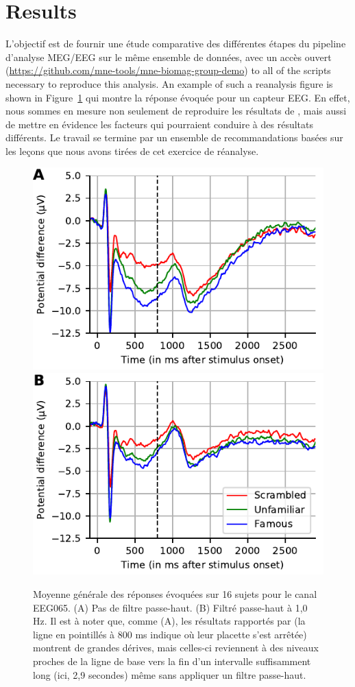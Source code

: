 \section*{Results}

L'objectif est de fournir une étude comparative des différentes étapes du pipeline d'analyse MEG/EEG sur le même ensemble de données, avec un accès ouvert (\url{https://github.com/mne-tools/mne-biomag-group-demo}) to all of the scripts necessary to reproduce this analysis. An example of such a reanalysis figure is shown in Figure~\ref{fig:sommaire:grand_average} qui montre la réponse évoquée pour un capteur EEG. En effet, nous sommes en mesure non seulement de reproduire les résultats de \citet{wakeman2015multi}, mais aussi de mettre en évidence les facteurs qui pourraient conduire à des résultats différents. Le travail se termine par un ensemble de recommandations basées sur les leçons que nous avons tirées de cet exercice de réanalyse.

\begin{figure}[htb]
  \centering
  \includegraphics[width=0.7\linewidth]{figures/grand_average_highpass-NoneHz.pdf}\\
  \includegraphics[width=0.7\linewidth]{figures/grand_average_highpass-1Hz.pdf}
\caption[]{Moyenne générale des réponses évoquées sur 16 sujets pour le canal EEG065. (A) Pas de filtre passe-haut. (B) Filtré passe-haut à 1,0 Hz. Il est à noter que, comme (A), les résultats rapportés par \cite{wakeman2015multi} (la ligne en pointillés à 800 ms indique où leur placette s'est arrêtée) montrent de grandes dérives, mais celles-ci reviennent à des niveaux proches de la ligne de base vers la fin d'un intervalle suffisamment long (ici, 2,9 secondes) même sans appliquer un filtre passe-haut.}
\label{fig:sommaire:grand_average}
\end{figure}  

